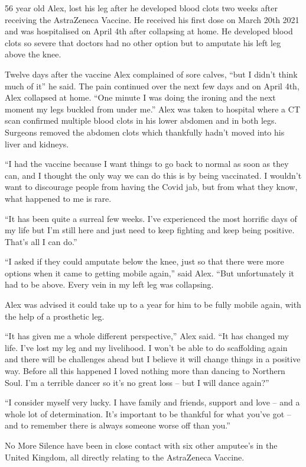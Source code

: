 56 year old Alex, lost his leg after he developed blood clots two weeks after
receiving the AstraZeneca Vaccine. He received his first dose on March 20th 2021
and was hospitalised on April 4th after collapsing at home. He developed blood
clots so severe that doctors had no other option but to amputate his left leg
above the knee.

Twelve days after the vaccine Alex complained of sore calves, “but I didn’t
think much of it” he said. The pain continued over the next few days and on
April 4th, Alex collapsed at home. “One minute I was doing the ironing and the
next moment my legs buckled from under me.” Alex was taken to hospital where a
CT scan confirmed multiple blood clots in his lower abdomen and in both
legs. Surgeons removed the abdomen clots which thankfully hadn’t moved into his
liver and kidneys.

“I had the vaccine because I want things to go back to normal as soon as they
can, and I thought the only way we can do this is by being vaccinated. I
wouldn’t want to discourage people from having the Covid jab, but from what they
know, what happened to me is rare.

“It has been quite a surreal few weeks. I’ve experienced the most horrific days
of my life but I’m still here and just need to keep fighting and keep being
positive. That’s all I can do.”

“I asked if they could amputate below the knee, just so that there were more
options when it came to getting mobile again,” said Alex. “But unfortunately it
had to be above. Every vein in my left leg was collapsing.

Alex was advised it could take up to a year for him to be fully mobile again,
with the help of a prosthetic leg.

“It has given me a whole different perspective,” Alex said. “It has changed my
life. I’ve lost my leg and my livelihood. I won’t be able to do scaffolding
again and there will be challenges ahead but I believe it will change things in
a positive way. Before all this happened I loved nothing more than dancing to
Northern Soul. I’m a terrible dancer so it’s no great loss – but I will dance
again?”

“I consider myself very lucky. I have family and friends, support and love – and
a whole lot of determination. It’s important to be thankful for what you’ve got
– and to remember there is always someone worse off than you.”

No More Silence have been in close contact with six other amputee’s in the
United Kingdom, all directly relating to the AstraZeneca Vaccine.
